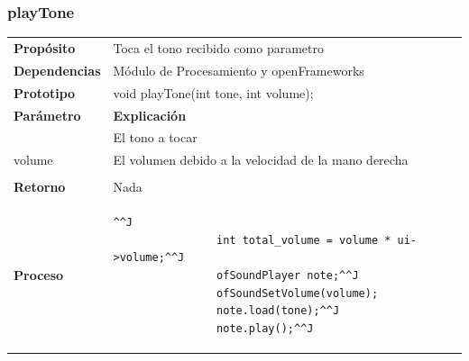 \documentclass[a4paper,10pt]{article}
\begin{document}
\subsubsection{playTone}
\begin{tabularx}{\textwidth}{p{25mm} X}
        \textbf{Propósito} & Toca el tono recibido como parametro \\
        \textbf{Dependencias} & Módulo de Procesamiento y openFrameworks\\
        \textbf{Prototipo} & void playTone(int tone, int volume);\\
        \textbf{Parámetro} & \textbf{Explicación} \\
        \begin{tabular}{p{2cm} l}
                tone & El tono a tocar \\
                volume & El volumen debido a la velocidad de la mano derecha\\
        \end{tabular}\\
        \textbf{Retorno} & Nada \\
        \textbf{Proceso} & 
        \begin{lstlisting}[breaklines=true]^^J
                int total_volume = volume * ui->volume;^^J
                ofSoundPlayer note;^^J
                ofSoundSetVolume(volume);
                note.load(tone);^^J
                note.play();^^J
        \end{lstlisting}

        \\
\end{tabularx}

\newpage
\end{document}
